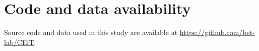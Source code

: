 \documentclass[final,5p,times,twocolumn,authoryear]{elsarticle}
\begin{document}
\section*{Code and data availability}

Source code and data used in this study are available at \url{https://github.com/bet-lab/CEiT}.



%  
 







\end{document}
